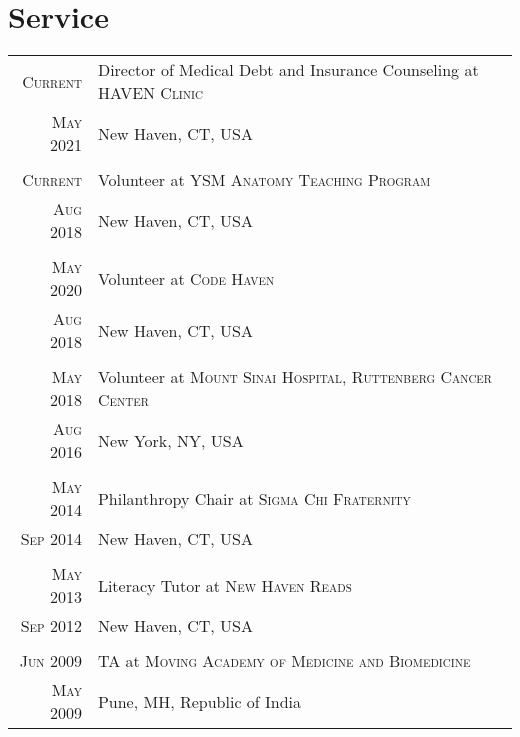 \documentclass[a4paper,10pt]{article}
\begin{document}
\section{Service}
\begin{longtable}{r|p{11cm}}
 \nopagebreak \textsc{Current} & Director of Medical Debt and Insurance Counseling at \textsc{HAVEN Clinic} \\
 \nopagebreak \textsc{May 2021} &  \small{New Haven, CT, USA}\\
 \multicolumn{2}{c}{} \\
 \nopagebreak \textsc{Current} & Volunteer at \textsc{YSM Anatomy Teaching Program} \\
 \nopagebreak \textsc{Aug 2018} &  \small{New Haven, CT, USA}\\
 \multicolumn{2}{c}{} \\
  \nopagebreak \textsc{May 2020} & Volunteer at \textsc{Code Haven} \\
 \nopagebreak \textsc{Aug 2018} &  \small{New Haven, CT, USA}\\
 \multicolumn{2}{c}{} \\
 \nopagebreak \textsc{May 2018} & Volunteer at \textsc{Mount Sinai Hospital, Ruttenberg Cancer Center} \\
 \nopagebreak \textsc{Aug 2016} &  \small{New York, NY, USA}\\
 \multicolumn{2}{c}{} \\
 \nopagebreak \textsc{May 2014} & Philanthropy Chair at \textsc{Sigma Chi Fraternity}\\
 \nopagebreak \textsc{Sep 2014} & \small{New Haven, CT, USA} \\
 \multicolumn{2}{c}{} \\
 \nopagebreak \textsc{May 2013} & Literacy Tutor at \textsc{New Haven Reads}\\
 \nopagebreak \textsc{Sep 2012} & \small{New Haven, CT, USA} \\
 \multicolumn{2}{c}{} \\
 \nopagebreak \textsc{Jun 2009} & TA at \textsc{Moving Academy of Medicine and Biomedicine} \\
 \nopagebreak \textsc{May 2009} & \small{Pune, MH, Republic of India} \\
\end{longtable}

\end{document}
